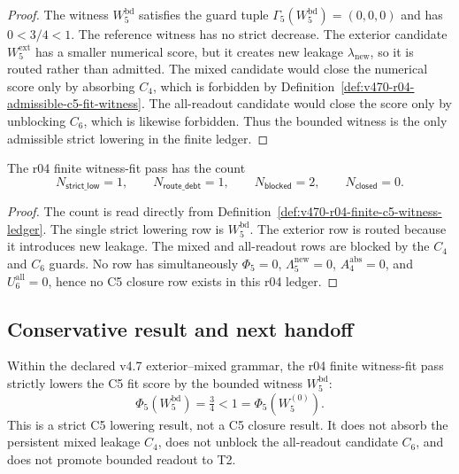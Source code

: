 \begin{proof}
The witness \(W_5^{\mathrm{bd}}\) satisfies the guard tuple
\(\Gamma_5(W_5^{\mathrm{bd}})=(0,0,0)\) and has
\(0<3/4<1\).  The reference witness has no strict decrease.  The exterior
candidate \(W_5^{\mathrm{ext}}\) has a smaller numerical score, but it creates
new leakage \(\lambda_{\mathrm{new}}\), so it is routed rather than admitted.
The mixed candidate would close the numerical score only by absorbing \(C_4\),
which is forbidden by Definition~\ref{def:v470-r04-admissible-c5-fit-witness}.
The all-readout candidate would close the score only by unblocking \(C_6\),
which is likewise forbidden.  Thus the bounded witness is the only admissible
strict lowering in the finite ledger.
\end{proof}

\begin{proposition}
\label{prop:v470-r04-c5-lowering-count}
The r04 finite witness-fit pass has the count
\[
N_{\mathsf{strict\_low}}=1,
\qquad
N_{\mathsf{route\_debt}}=1,
\qquad
N_{\mathsf{blocked}}=2,
\qquad
N_{\mathsf{closed}}=0.
\]
\end{proposition}

\begin{proof}
The count is read directly from Definition~\ref{def:v470-r04-finite-c5-witness-ledger}.
The single strict lowering row is \(W_5^{\mathrm{bd}}\).  The exterior row is
routed because it introduces new leakage.  The mixed and all-readout rows are
blocked by the \(C_4\) and \(C_6\) guards.  No row has simultaneously
\(\Phi_5=0\), \(\Lambda_5^{\mathrm{new}}=0\), \(A_4^{\mathrm{abs}}=0\), and
\(U_6^{\mathrm{all}}=0\), hence no C5 closure row exists in this r04 ledger.
\end{proof}

\subsection{Conservative result and next handoff}
\label{subsec:v470-r04-conservative-result-handoff}

\begin{theorem}
\label{thm:v470-r04-conservative-finite-c5-lowering-theorem}
Within the declared v4.7 exterior--mixed grammar, the r04 finite witness-fit
pass strictly lowers the C5 fit score by the bounded witness
\(W_5^{\mathrm{bd}}\):
\[
\Phi_5(W_5^{\mathrm{bd}})=\tfrac34 < 1=\Phi_5(W_5^{(0)}).
\]
This is a strict C5 lowering result, not a C5 closure result.  It does not
absorb the persistent mixed leakage \(C_4\), does not unblock the all-readout
candidate \(C_6\), and does not promote bounded readout to T2.
\end{theorem}

